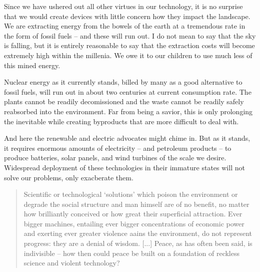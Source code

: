 \documentclass[letterpaper]{article}
\begin{document}
    Since we have ushered out all other virtues in our technology, it is no surprise that we would create devices with little concern how they impact the landscape. We are extracting energy from the bowels of the earth at a tremendous rate in the form of fossil fuels -- and these will run out. I do not mean to say that the sky is falling, but it is entirely reasonable to say that the extraction costs will become extremely high within the millenia. We owe it to our children to use much less of this mined energy.

    Nuclear energy as it currently stands, billed by many as a good alternative to fossil fuels, will run out in about two centuries at current consumption rate. The plants cannot be readily decomissioned and the waste cannot be readily safely reabsorbed into the environment. Far from being a savior, this is only prolonging the inevitable while creating byproducts that are more difficult to deal with.

    And here the renewable and electric advocates might chime in. But as it stands, it requires enormous amounts of electricity -- and petroleum products -- to produce batteries, solar panels, and wind turbines of the scale we desire. Widespread deployment of these technologies in their immature states will not solve our problems, only exacberate them.


    \begin{quote}
      Scientific or technological `solutions' which poison the environment or degrade the social structure and man himself are of no benefit, no matter how brilliantly conceived or how great their superficial attraction. Ever bigger machines, entailing ever bigger concentrations of economic power and exerting ever greater violence aains the environment, do not represent progress: they are a denial of wisdom. [...] Peace, as has often been said, is indivisible -- how then could peace be built on a foundation of reckless science and violent technology?
    \end{quote}
\end{document}
